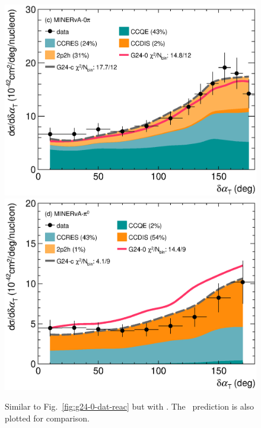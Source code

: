 \begin{figure}
        \includegraphics[width=\dbfigwid\textwidth]{figures/tuning/0026-min_0pi_dalphat_reac_decomp_covfix.eps}
        \includegraphics[width=\dbfigwid\textwidth]{figures/tuning/0026-min_pi0_dalphat_reac_decomp_covfix.eps}
        \caption{\label{fig:g24-c-dat-reac} 
        Similar to Fig.~\ref{fig:g24-0-dat-reac} but with \gC.  The \gZero\ prediction is also plotted for comparison. 
        } 


\end{figure}
